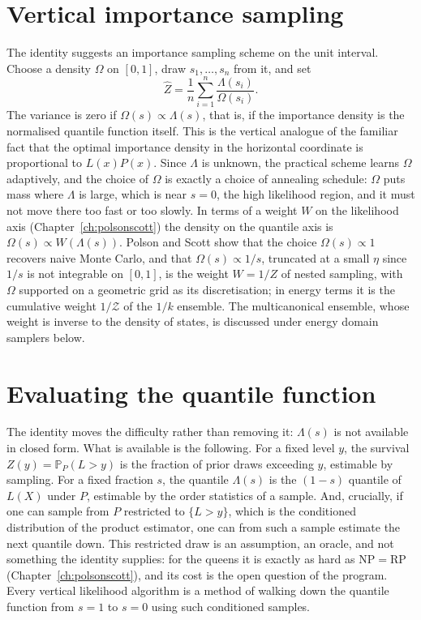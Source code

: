 \documentclass[11pt,twoside,openany]{book}
\theoremstyle{plain}
\theoremstyle{definition}
\theoremstyle{remark}
\newcommand{\PP}{\mathbb{P}}
\newcommand{\RP}{\mathrm{RP}}
\newcommand{\NP}{\mathrm{NP}}
\begin{document}
\section{Vertical importance sampling}

The identity suggests an importance sampling scheme on the unit interval. Choose a density $\Omega$ on $[0, 1]$, draw $s_1, \dots, s_n$ from it, and set
\[
\hat Z = \frac{1}{n} \sum_{i=1}^{n} \frac{\Lambda(s_i)}{\Omega(s_i)} .
\]
The variance is zero if $\Omega(s) \propto \Lambda(s)$, that is, if the importance density is the normalised quantile function itself. This is the vertical analogue of the familiar fact that the optimal importance density in the horizontal coordinate is proportional to $L(x) P(x)$. Since $\Lambda$ is unknown, the practical scheme learns $\Omega$ adaptively, and the choice of $\Omega$ is exactly a choice of annealing schedule: $\Omega$ puts mass where $\Lambda$ is large, which is near $s = 0$, the high likelihood region, and it must not move there too fast or too slowly. In terms of a weight $W$ on the likelihood axis (Chapter~\ref{ch:polsonscott}) the density on the quantile axis is $\Omega(s) \propto W(\Lambda(s))$. Polson and Scott show that the choice $\Omega(s) \propto 1$ recovers naive Monte Carlo, and that $\Omega(s) \propto 1/s$, truncated at a small $\eta$ since $1/s$ is not integrable on $[0, 1]$, is the weight $W = 1/Z$ of nested sampling, with $\Omega$ supported on a geometric grid as its discretisation; in energy terms it is the cumulative weight $1/\mathcal{Z}$ of the $1/k$ ensemble. The multicanonical ensemble, whose weight is inverse to the density of states, is discussed under energy domain samplers below.

\section{Evaluating the quantile function}

The identity moves the difficulty rather than removing it: $\Lambda(s)$ is not available in closed form. What is available is the following. For a fixed level $y$, the survival $Z(y) = \PP_P(L > y)$ is the fraction of prior draws exceeding $y$, estimable by sampling. For a fixed fraction $s$, the quantile $\Lambda(s)$ is the $(1 - s)$ quantile of $L(X)$ under $P$, estimable by the order statistics of a sample. And, crucially, if one can sample from $P$ restricted to $\{L > y\}$, which is the conditioned distribution of the product estimator, one can from such a sample estimate the next quantile down. This restricted draw is an assumption, an oracle, and not something the identity supplies: for the queens it is exactly as hard as $\NP = \RP$ (Chapter~\ref{ch:polsonscott}), and its cost is the open question of the program. Every vertical likelihood algorithm is a method of walking down the quantile function from $s = 1$ to $s = 0$ using such conditioned samples.
\end{document}
